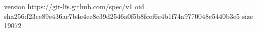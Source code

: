 version https://git-lfs.github.com/spec/v1
oid sha256:f23ce89e436ac7b4e4ee8c39d2546a0f5b8fcef6e4b1f74a9770048c5440b3e5
size 19072
